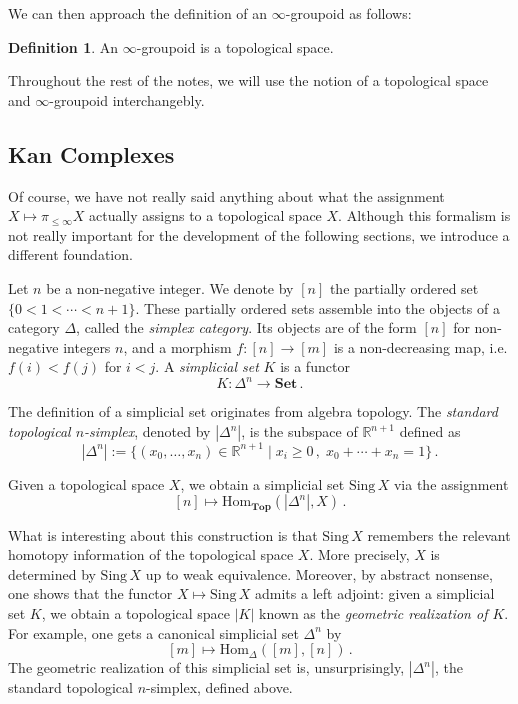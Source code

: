 \documentclass[a4paper,11pt]{article}
\newcommand{\Hom}{\mathrm{Hom}}
\newcommand{\sets}{\mathbf{Set}}
\newcommand{\topo}{\mathbf{Top}}
\theoremstyle{plain}
\theoremstyle{definition}
\newtheorem{defi}[thm]{Definition}
\theoremstyle{remark}
\begin{document}
We can then approach the definition of an $\infty$-groupoid as follows: 

\begin{defi}
An $\infty$-groupoid is a topological space. 
\end{defi}

Throughout the rest of the notes, we will use the notion of a topological space and $\infty$-groupoid interchangebly. 



\subsection{Kan Complexes}
\label{kan_complexes}
Of course, we have not really said anything about what the assignment $X \mapsto \pi_{\leq \infty} X$ actually assigns to a topological space $X$. Although this formalism is not really important for the development of the following sections, we introduce a different foundation. 

Let $n$ be a non-negative integer. We denote by $[n]$ the partially ordered set $\{0 < 1 < \cdots < n+1\}$. These partially ordered sets assemble into the objects of a category $\Delta$, called the \textit{simplex category}. Its objects are of the form $[n]$ for non-negative integers $n$, and a morphism $f \colon [n] \to [m]$ is a non-decreasing map, i.e. $f(i) < f(j)$ for $i<j$. A \textit{simplicial set} $K$ is a functor
$$K \colon \Delta^n \to \sets \, .$$

The definition of a simplicial set originates from algebra topology. The \textit{standard topological $n$-simplex}, denoted by $|\Delta^n|$, is the subspace of $\mathbb{R}^{n+1}$ defined as 
$$|\Delta^n| := \{(x_0, \dots , x_n) \in \mathbb{R}^{n+1} \mid x_i \geq 0 \, , \; x_0 + \cdots + x_n = 1\} \, .$$

Given a topological space $X$, we obtain a simplicial set $\text{Sing}\, X$ via the assignment 
$$[n] \mapsto \Hom_{\topo}(|\Delta^n|, X) \, .$$

What is interesting about this construction is that $\text{Sing}\, X$ remembers the relevant homotopy information of the topological space $X$. More precisely, $X$ is determined by $\text{Sing}\, X$ up to weak equivalence. Moreover, by abstract nonsense, one shows that the functor $X \mapsto \text{Sing}\, X$ admits a left adjoint: given a simplicial set $K$, we obtain a topological space $|K|$ known as the \textit{geometric realization of $K$}. For example, one gets a canonical simplicial set $\Delta^n$ by 
$$[m] \mapsto \Hom_{\Delta}([m], [n]) \, .$$
The geometric realization of this simplicial set is, unsurprisingly, $|\Delta^n|$, the standard topological $n$-simplex, defined above. 
\end{document}

